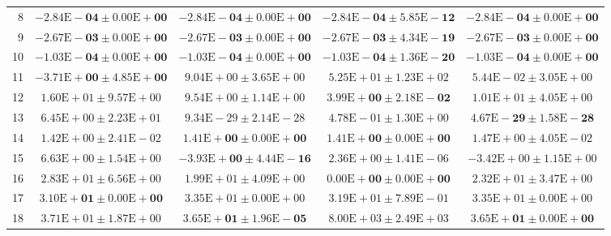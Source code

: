\documentclass[conference]{IEEEtran}
\begin{document}
\begin{table}[!t]
\begin{tabular}{rcccc}
8  & $\bm{-2.84\mathrm{E}{-}04 \pm 0.00\mathrm{E}{+}00}$ & $\bm{-2.84\mathrm{E}{-}04 \pm 0.00\mathrm{E}{+}00}$ & $\bm{-2.84\mathrm{E}{-}04 \pm 5.85\mathrm{E}{-}12}$ & $\bm{-2.84\mathrm{E}{-}04 \pm 0.00\mathrm{E}{+}00}$ \\
9  & $\bm{-2.67\mathrm{E}{-}03 \pm 0.00\mathrm{E}{+}00}$ & $\bm{-2.67\mathrm{E}{-}03 \pm 0.00\mathrm{E}{+}00}$ & $\bm{-2.67\mathrm{E}{-}03 \pm 4.34\mathrm{E}{-}19}$ & $\bm{-2.67\mathrm{E}{-}03 \pm 0.00\mathrm{E}{+}00}$ \\
10 & $\bm{-1.03\mathrm{E}{-}04 \pm 0.00\mathrm{E}{+}00}$ & $\bm{-1.03\mathrm{E}{-}04 \pm 0.00\mathrm{E}{+}00}$ & $\bm{-1.03\mathrm{E}{-}04 \pm 1.36\mathrm{E}{-}20}$ & $\bm{-1.03\mathrm{E}{-}04 \pm 0.00\mathrm{E}{+}00}$ \\
11 & $\bm{-3.71\mathrm{E}{+}00 \pm 4.85\mathrm{E}{+}00}$ & $9.04\mathrm{E}{+}00 \pm 3.65\mathrm{E}{+}00$ & $5.25\mathrm{E}{+}01 \pm 1.23\mathrm{E}{+}02$ & $5.44\mathrm{E}{-}02 \pm 3.05\mathrm{E}{+}00$ \\
12 & $1.60\mathrm{E}{+}01 \pm 9.57\mathrm{E}{+}00$ & $9.54\mathrm{E}{+}00 \pm 1.14\mathrm{E}{+}00$ & $\bm{3.99\mathrm{E}{+}00 \pm 2.18\mathrm{E}{-}02}$ & $1.01\mathrm{E}{+}01 \pm 4.05\mathrm{E}{+}00$ \\
13 & $6.45\mathrm{E}{+}00 \pm 2.23\mathrm{E}{+}01$ & $9.34\mathrm{E}{-}29 \pm 2.14\mathrm{E}{-}28$ & $4.78\mathrm{E}{-}01 \pm 1.30\mathrm{E}{+}00$ & $\bm{4.67\mathrm{E}{-}29 \pm 1.58\mathrm{E}{-}28}$ \\
14 & $1.42\mathrm{E}{+}00 \pm 2.41\mathrm{E}{-}02$ & $\bm{1.41\mathrm{E}{+}00 \pm 0.00\mathrm{E}{+}00}$ & $\bm{1.41\mathrm{E}{+}00 \pm 0.00\mathrm{E}{+}00}$ & $1.47\mathrm{E}{+}00 \pm 4.05\mathrm{E}{-}02$ \\
15 & $6.63\mathrm{E}{+}00 \pm 1.54\mathrm{E}{+}00$ & $\bm{-3.93\mathrm{E}{+}00 \pm 4.44\mathrm{E}{-}16}$ & $2.36\mathrm{E}{+}00 \pm 1.41\mathrm{E}{-}06$ & $-3.42\mathrm{E}{+}00 \pm 1.15\mathrm{E}{+}00$ \\
16 & $2.83\mathrm{E}{+}01 \pm 6.56\mathrm{E}{+}00$ & $1.99\mathrm{E}{+}01 \pm 4.09\mathrm{E}{+}00$ & $\bm{0.00\mathrm{E}{+}00 \pm 0.00\mathrm{E}{+}00}$ & $2.32\mathrm{E}{+}01 \pm 3.47\mathrm{E}{+}00$ \\
17 & $\bm{3.10\mathrm{E}{+}01 \pm 0.00\mathrm{E}{+}00}$ & $3.35\mathrm{E}{+}01 \pm 0.00\mathrm{E}{+}00$ & $3.19\mathrm{E}{+}01 \pm 7.89\mathrm{E}{-}01$ & $3.35\mathrm{E}{+}01 \pm 0.00\mathrm{E}{+}00$ \\
18 & $3.71\mathrm{E}{+}01 \pm 1.87\mathrm{E}{+}00$ & $\bm{3.65\mathrm{E}{+}01 \pm 1.96\mathrm{E}{-}05}$ & $8.00\mathrm{E}{+}03 \pm 2.49\mathrm{E}{+}03$ & $\bm{3.65\mathrm{E}{+}01 \pm 0.00\mathrm{E}{+}00}$ \\

\end{tabular}
\end{table}
\end{document}
